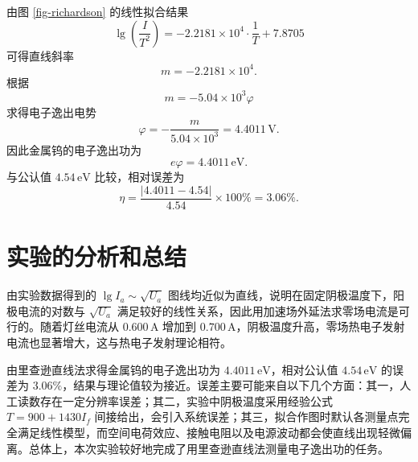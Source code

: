 \documentclass{../template/myrpt}
\begin{document}
由图 \ref{fig-richardson} 的线性拟合结果
\[
\lg\left(\frac{I}{T^2}\right) = -2.2181\times 10^4 \cdot \frac{1}{T} + 7.8705
\]
可得直线斜率
\[
m = -2.2181\times 10^4.
\]
根据
\[
m = -5.04\times 10^3 \varphi
\]
求得电子逸出电势
\[
\varphi = -\frac{m}{5.04\times 10^3} = 4.4011\,\mathrm{V}.
\]
因此金属钨的电子逸出功为
\[
e\varphi = 4.4011\,\mathrm{eV}.
\]
与公认值 $4.54\,\mathrm{eV}$ 比较，相对误差为
\[
\eta = \frac{|4.4011 - 4.54|}{4.54}\times 100\% = 3.06\%.
\]

\section{实验的分析和总结}

由实验数据得到的 $\lg I_a \sim \sqrt{U_a}$ 图线均近似为直线，说明在固定阴极温度下，阳极电流的对数与 $\sqrt{U_a}$ 满足较好的线性关系，因此用加速场外延法求零场电流是可行的。随着灯丝电流从 $0.600\,\mathrm{A}$ 增加到 $0.700\,\mathrm{A}$，阴极温度升高，零场热电子发射电流也显著增大，这与热电子发射理论相符。

由里查逊直线法求得金属钨的电子逸出功为 $4.4011\,\mathrm{eV}$，相对公认值 $4.54\,\mathrm{eV}$ 的误差为 $3.06\%$，结果与理论值较为接近。误差主要可能来自以下几个方面：其一，人工读数存在一定分辨率误差；其二，实验中阴极温度采用经验公式 $T=900+1430I_f$ 间接给出，会引入系统误差；其三，拟合作图时默认各测量点完全满足线性模型，而空间电荷效应、接触电阻以及电源波动都会使直线出现轻微偏离。总体上，本次实验较好地完成了用里查逊直线法测量电子逸出功的任务。

%

\newpage

\insertSignedDataPage
\end{document}
